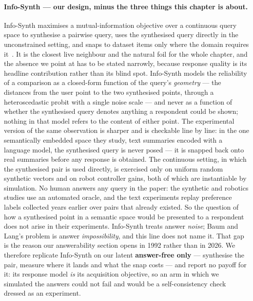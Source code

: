 \documentclass[11pt]{article}
\begin{document}
\paragraph{Info-Synth --- our design, minus the three things this chapter is about.} Info-Synth
maximises a mutual-information objective over a continuous query space to synthesise a pairwise
query, uses the synthesised query directly in the unconstrained setting, and snaps to dataset items
only where the domain requires it~\cite{nadagouda2026infosynth}. It is the closest live neighbour and
the natural foil for the whole chapter, and the absence we point at has to be stated narrowly,
because response quality is its headline contribution rather than its blind spot. Info-Synth models
the reliability of a comparison as a closed-form function of the query's \emph{geometry} --- the
distances from the user point to the two synthesised points, through a heteroscedastic probit with a
single noise scale --- and never as a function of whether the synthesised query denotes anything a
respondent could be shown; nothing in that model refers to the content of either point. The
experimental version of the same observation is sharper and is checkable line by line: in the one
semantically embedded space they study, text summaries encoded with a language model, the synthesised
query is never posed --- it is snapped back onto real summaries before any response is obtained. The
continuous setting, in which the synthesised pair is used directly, is exercised only on uniform
random synthetic vectors and on robot controller gains, both of which are instantiable by simulation.
No human answers any query in the paper: the synthetic and robotics studies use an automated oracle,
and the text experiments replay preference labels collected years earlier over pairs that already
existed. So the question of how a synthesised point in a semantic space would be presented to a
respondent does not arise in their experiments. Info-Synth treats answer \emph{noise}; Baum and Lang's
problem is answer \emph{impossibility}, and this line does not name it. That gap is the reason our
answerability section opens in 1992 rather than in 2026. We therefore replicate Info-Synth on our
latent \textbf{answer-free only} --- synthesise the pair, measure where it lands and what the snap
costs --- and report no payoff for it: its response model \emph{is} its acquisition objective, so an
arm in which we simulated the answers could not fail and would be a self-consistency check dressed as
an experiment.
\end{document}
